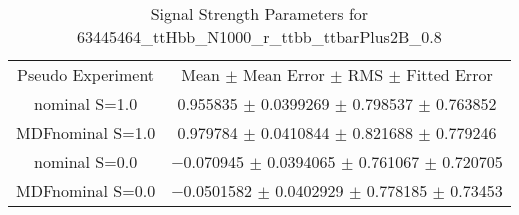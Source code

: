 \begin{table}
\centering
\caption{Signal Strength Parameters for 63445464\_ttHbb\_N1000\_r\_ttbb\_ttbarPlus2B\_0.8}
\begin{tabular}{cc}
\toprule
Pseudo Experiment & Mean $\pm$ Mean Error $\pm$ RMS $\pm$ Fitted Error\\
nominal S=1.0 & \num{0.955835} $\pm$ \num{0.0399269} $\pm$ \num{0.798537} $\pm$ \num{0.763852}\\
MDFnominal S=1.0 & \num{0.979784} $\pm$ \num{0.0410844} $\pm$ \num{0.821688} $\pm$ \num{0.779246}\\
nominal S=0.0 & \num{-0.070945} $\pm$ \num{0.0394065} $\pm$ \num{0.761067} $\pm$ \num{0.720705}\\
MDFnominal S=0.0 & \num{-0.0501582} $\pm$ \num{0.0402929} $\pm$ \num{0.778185} $\pm$ \num{0.73453}\\
\bottomrule
\end{tabular}
\end{table}